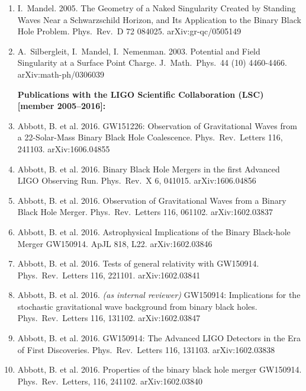 \documentclass[margin,line]{res}
\begin{document}
\begin{resume}
\begin{enumerate}
\item  I.~Mandel. 2005. The Geometry of a Naked Singularity Created by Standing 
Waves Near a Schwarzschild Horizon, and Its Application to the Binary 
Black Hole Problem. Phys.~Rev.~D 72 084025.  arXiv:gr-qc/0505149

\item  A.~Silbergleit, I.~Mandel, I.~Nemenman.  2003.  Potential and Field 
Singularity at a Surface Point Charge.  J.~Math.~Phys.~44 (10) 
4460-4466.  arXiv:math-ph/0306039

\vspace{0.2in}
{\bf \large Publications with the LIGO Scientific Collaboration (LSC) [member 2005--2016]:}


\item Abbott, B. et al. 2016.  GW151226: Observation of Gravitational Waves from a 22-Solar-Mass Binary Black Hole Coalescence.  Phys.~Rev.~Letters 116, 241103.  	arXiv:1606.04855

\item Abbott, B. et al. 2016.  Binary Black Hole Mergers in the first Advanced LIGO Observing Run.  Phys.~Rev.~X 6, 041015.  	arXiv:1606.04856

\item Abbott, B. et al. 2016.  Observation of Gravitational Waves from a Binary Black Hole Merger.  Phys.~Rev.~Letters 116, 061102.  arXiv:1602.03837

\item Abbott, B. et al. 2016.  Astrophysical Implications of the Binary Black-hole Merger GW150914.  ApJL 818, L22. arXiv:1602.03846

\item Abbott, B. et al. 2016. Tests of general relativity with GW150914. Phys.~Rev.~Letters 116, 221101. arXiv:1602.03841

\item Abbott, B. et al. 2016.  {\it (as internal reviewer)}   GW150914: Implications for the stochastic gravitational wave background from binary black holes.  Phys.~Rev.~Letters 116, 131102.  arXiv:1602.03847

\item Abbott, B. et al. 2016. GW150914: The Advanced LIGO Detectors in the Era of First Discoveries.   Phys.~Rev.~Letters 116, 131103.  arXiv:1602.03838

\item Abbott, B. et al. 2016. Properties of the binary black hole merger GW150914.   Phys.~Rev.~Letters, 116, 241102.  arXiv:1602.03840


\end{enumerate}
\end{resume}
\end{document}

